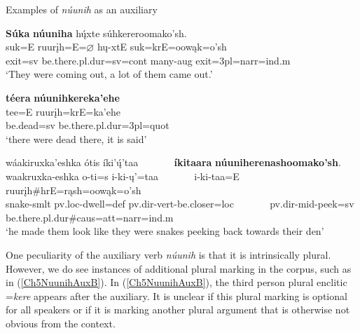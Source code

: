 \begin{exe}

\item\label{Ch5NuunihAux} Examples of \textit{núunih} as an auxiliary

\begin{xlist}
    \item\label{Ch5NuunihAuxA} \glll \textbf{Súka} \textbf{núuniha} hų́xte súhkereroomako'sh.\\
    suk=E ruurįh=E=$\varnothing$ hų-xtE suk=krE=oowąk=o'sh\\
    \textnormal{exit}=sv \textnormal{be.there}.pl.dur=sv=cont \textnormal{many}-aug \textnormal{exit}=3pl=narr=ind.m\\
    \glt `They were coming out, a lot of them came out.' \citep[109]{hollow1973b}

    \item\label{Ch5NuunihAuxB} \glll \textbf{téera} \textbf{núunihkereka'ehe}\\
    tee=E ruurįh=krE=ka'ehe\\
    \textnormal{be.dead}=sv \textnormal{be.there}.pl.dur=3pl=quot\\
    \glt `there were dead there, it is said' \citep[166]{hollow1973b}

    \item\label{Ch5NuunihAuxC} \glll wáakiruxka'eshka ótis íki'ų́'taa ~ ~ ~ ~ \textbf{íkitaara} \textbf{núuniherenashoomako'sh}.\\
    waakruxka-eshka o-ti=s i-ki-ų'=taa ~ ~ ~ ~ i-ki-taa=E ruurįh\#hrE=rąsh=oowąk=o'sh\\
    \textnormal{snake}-smlt pv.loc-\textnormal{dwell}=def pv.dir-vert-\textnormal{be.closer}=loc ~ ~ ~ ~ pv.dir-mid-\textnormal{peek}=sv \textnormal{be.there}.pl.dur\#caus=att=narr=ind.m\\
    \glt `he made them look like they were snakes peeking back towards their den' \citep[69]{trechter2012b}
\end{xlist}

\end{exe}

One peculiarity of the auxiliary verb \textit{núunih} is that it is intrinsically plural. However, we do see instances of additional plural marking in the corpus, such as in (\ref{Ch5NuunihAuxB}). In (\ref{Ch5NuunihAuxB}), the third person plural enclitic =\textit{kere} appears after the auxiliary. It is unclear if this plural marking is optional for all speakers or if it is marking another plural argument that is otherwise not obvious from the context.

